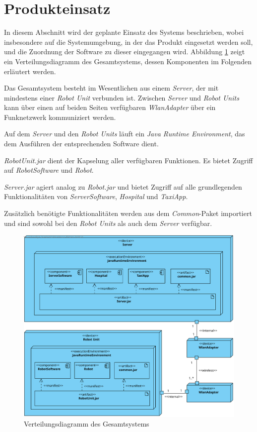 \section{Produkteinsatz}

In diesem Abschnitt wird der geplante Einsatz des Systems beschrieben, wobei
insbesondere auf die Systemumgebung, in der das Produkt eingesetzt werden soll,
und die Zuordnung der Software zu dieser eingegangen wird. 
Abbildung \ref{ProdukteinsatzKomp}
zeigt ein Verteilungsdiagramm des Gesamtsystems, dessen Komponenten im Folgenden
erläutert werden.

Das Gesamtsystem besteht im Wesentlichen aus einem \emph{Server}, der mit mindestens einer
\emph{Robot Unit} verbunden ist. Zwischen \emph{Server} und \emph{Robot Units} kann über
einen auf beiden Seiten verfügbaren \emph{Wlan\-Adapter} über ein
Funknetzwerk kommuniziert werden.

Auf dem \emph{Server} und den \emph{Robot Units} läuft ein \emph{Java Runtime Environment},
das dem Ausführen der entsprechenden Software dient.

\emph{RobotUnit.jar} dient der Kapselung aller verfügbaren Funktionen. Es bietet Zugriff
auf \emph{RobotSoftware} und \emph{Robot}.

\emph{Server.jar} agiert analog zu \emph{Robot.jar} und bietet Zugriff auf alle grundlegenden 
Funktionalitäten von \emph{ServerSoftware}, \emph{Hospital} und \emph{TaxiApp}.

Zusätzlich benötigte Funktionalitäten werden aus dem \emph{Common}-Paket importiert und sind
sowohl bei den \emph{Robot Units} als auch dem \emph{Server} verfügbar.

\begin{figure}[H]
	\centering
	\includegraphics[width=1\textwidth]{img/2-Entwurf-9-Produkteinsatz}
	\caption{Verteilungsdiagramm des Gesamtsystems}
	\label{ProdukteinsatzKomp}
\end{figure}
